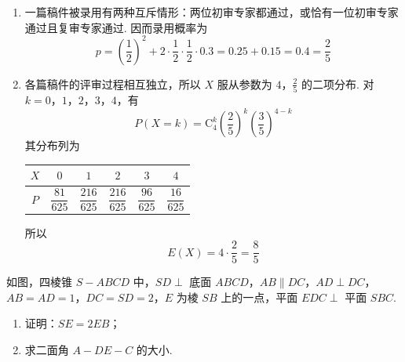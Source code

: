 \begin{solution}
\begin{enumerate}
\item 一篇稿件被录用有两种互斥情形：两位初审专家都通过，或恰有一位初审专家通过且复审专家通过. 因而录用概率为
\[
p=\left(\frac12\right)^{2}
+2\cdot\frac12\cdot\frac12\cdot0.3
=0.25+0.15=0.4=\frac25
\]
\item 各篇稿件的评审过程相互独立，所以 \(X\) 服从参数为 \(4\)，\(\frac25\) 的二项分布. 对
\(k=0\)，\(1\)，\(2\)，\(3\)，\(4\)，有
\[
P(X=k)=\mathrm C_{4}^{k}\left(\frac25\right)^{k}\left(\frac35\right)^{4-k}
\]
其分布列为
\begin{center}
\begin{tabular}{c|ccccc}
\(X\) & \(0\) & \(1\) & \(2\) & \(3\) & \(4\) \\
\hline
\(P\) & \(\dfrac{81}{625}\) & \(\dfrac{216}{625}\) & \(\dfrac{216}{625}\) & \(\dfrac{96}{625}\) & \(\dfrac{16}{625}\)
\end{tabular}
\end{center}
所以
\[
E(X)=4\cdot\frac25=\frac85
\]
\end{enumerate}
\end{solution}

\begin{problem}
如图，四棱锥 \(S - ABCD\) 中，\(SD \perp\) 底面 \(ABCD\)，\(AB \parallel DC\)，\(AD \perp DC\)，\(AB = AD = 1\)，\(DC = SD = 2\)，\(E\) 为棱 \(SB\) 上的一点，平面 \(EDC \perp\) 平面 \(SBC\).
\begin{enumerate}
\item 证明：\(SE = 2EB\)；
\item 求二面角 \(A - DE - C\) 的大小.
\end{enumerate}
\end{problem}

